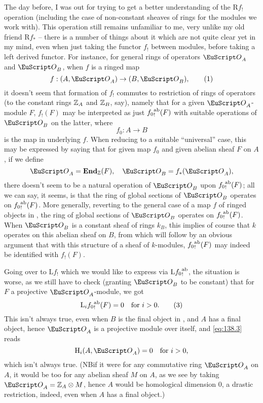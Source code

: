 The day before, I was out for trying to get a better understanding of
the $\mathrm Rf_!$ operation (including the case of non-constant
sheaves of rings for the modules we work with). This operation still
remains unfamiliar to me, very unlike my old friend $\mathrm Rf_*$ --
there is a number of things about it which are not quite clear yet in
my mind, even when just taking the functor $f_!$ between modules,
before taking a left derived functor. For instance, for general rings
of operators $\scrO_A$ and $\scrO_B$, when $f$ is a ringed map
\begin{equation}
  \label{eq:138.1}
  f: (A,\scrO_A) \to (B,\scrO_B),\tag{1}
\end{equation}
it doesn't seem that formation of $f_!$ commutes to restriction of
rings of operators (to the constant rings ${\mathbb{Z}}_A$ and ${\mathbb{Z}}_B$, say),
namely that for a given $\scrO_A$-module $F$, $f_!(F)$ may be
interpreted as just ${f_0}_!^{\mathrm{ab}}(F)$ with suitable operations of
$\scrO_B$ on the latter, where
\begin{equation}
  \label{eq:138.2}
  f_0:A\to B\tag{2}
\end{equation}
is the map in \Cat{} underlying $f$. When reducing to a suitable
``universal'' case, this may be expressed by saying that for given map
$f_0$ and given abelian sheaf $F$ on $A$, if we define
\[\scrO_A = \bEnd_\bZ(F), \quad \scrO_B=f_*(\scrO_A),\]
there doesn't seem to be a natural operation of $\scrO_B$ upon
${f_0}_!^{\mathrm{ab}}(F)$; all we can say, it seems, is that the ring of
global sections of $\scrO_B$ operates on ${f_0}_!^{\mathrm{ab}}(F)$. More
generally, reverting to the general case of a map $f$ of ringed
objects in \Cat, the ring of global sections of $\scrO_B$ operates on
${f_0}_!^{\mathrm{ab}}(F)$. When $\scrO_B$ is a constant sheaf of rings $k_B$,
this implies of course that $k$ operates on this abelian sheaf on $B$,
from which will follow by an obvious argument that with this structure
of a sheaf of $k$-modules, ${f_0}_!^{\mathrm{ab}}(F)$ may indeed be identified
with $f_!(F)$.

Going over to $\mathrm Lf_!$ which we would like to express via
$\mathrm L{f_0}_!^{\mathrm{ab}}$, the situation is worse, as we still have to
check (granting $\scrO_B$ to be constant) that for $F$ a projective
$\scrO_A$-module, we got
\begin{equation}
  \label{eq:138.3}
  \mathrm L_i{f_0}_!^{\mathrm{ab}}(F)=0\quad\text{for $i>0$.}\tag{3}
\end{equation}
This isn't always true, even when $B$ is the final object in \Cat, and
$A$ has a final object, hence $\scrO_A$ is a projective module
over itself, and \eqref{eq:138.3} reads
\[\mathrm H_i(A,\scrO_A) =0 \quad\text{for $i>0$,}\]
which isn't always true. (NB\enspace if it were for any commutative
ring $\scrO_A$ on $A$, it would be too for any abelian sheaf $M$ on
$A$, as we see by taking $\scrO_A=\bZ_A\otimes M$, hence $A$ would be
homological dimension $0$, a drastic restriction, indeed, even when
$A$ has a final object.)

